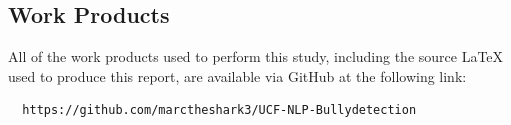 \documentclass[conference]{sig-alternate-05-2015}
\begin{document}
\subsection{Work Products}\label{subsec:work_products}

All of the work products used to perform this study, including the source
\LaTeX\; used to produce this report, are available via GitHub at the following
link:

\begin{verbatim}
  https://github.com/marctheshark3/UCF-NLP-Bullydetection
\end{verbatim}



\end{document}
